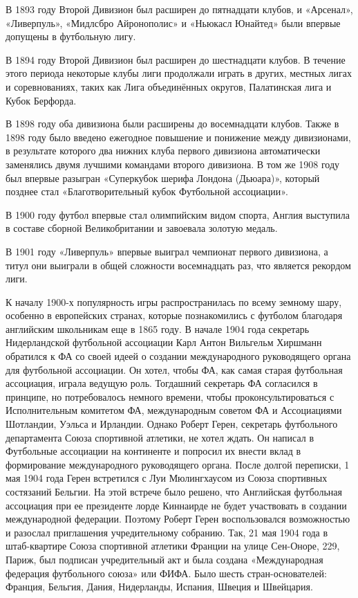 В 1893 году Второй Дивизион был расширен до пятнадцати клубов, и «Арсенал», «Ливерпуль», «Мидлсбро Айронополис» и «Ньюкасл Юнайтед» были впервые допущены в футбольную лигу.

В 1894 году Второй Дивизион был расширен до шестнадцати клубов. В течение этого периода некоторые клубы лиги продолжали играть в других, местных лигах и соревнованиях, таких как Лига объединённых округов, Палатинская лига и Кубок Берфорда.

В 1898 году оба дивизиона были расширены до восемнадцати клубов. Также в 1898 году было введено ежегодное повышение и понижение между дивизионами, в результате которого два нижних клуба первого дивизиона автоматически заменялись двумя лучшими командами второго дивизиона. В том же 1908 году был впервые разыгран «Суперкубок шерифа Лондона (Дьюара)», который позднее стал «Благотворительный кубок Футбольной ассоциации».

В 1900 году футбол впервые стал олимпийским видом спорта, Англия выступила в составе сборной Великобритании и завоевала золотую медаль.

В 1901 году «Ливерпуль» впервые выиграл чемпионат первого дивизиона, а титул они выиграли в общей сложности восемнадцать раз, что является рекордом лиги.

К началу 1900-х популярность игры распространилась по всему земному шару, особенно в европейских странах, которые познакомились с футболом благодаря английским школьникам еще в 1865 году. В начале 1904 года секретарь Нидерландской футбольной ассоциации Карл Антон Вильгельм Хиршманн обратился к ФА со своей идеей о создании международного руководящего органа для футбольной ассоциации. Он хотел, чтобы ФА, как самая старая футбольная ассоциация, играла ведущую роль. Тогдашний секретарь ФА согласился в принципе, но потребовалось немного времени, чтобы проконсультироваться с Исполнительным комитетом ФА, международным советом ФА и Ассоциациями Шотландии, Уэльса и Ирландии. Однако Роберт Герен, секретарь футбольного департамента Союза спортивной атлетики, не хотел ждать. Он написал в Футбольные ассоциации на континенте и попросил их внести вклад в формирование международного руководящего органа. После долгой переписки, 1 мая 1904 года Герен встретился с Луи Мюлингхаусом из Союза спортивных состязаний Бельгии. На этой встрече было решено, что Английская футбольная ассоциация при ее президенте лорде Киннаирде не будет участвовать в создании международной федерации. Поэтому Роберт Герен воспользовался возможностью и разослал приглашения учредительному собранию. Так, 21 мая 1904 года в штаб-квартире Союза спортивной атлетики Франции на улице Сен-Оноре, 229, Париж, был подписан учредительный акт и была создана «Международная федерация футбольного союза» или ФИФА. Было шесть стран-основателей: Франция, Бельгия, Дания, Нидерланды, Испания, Швеция и Швейцария.

